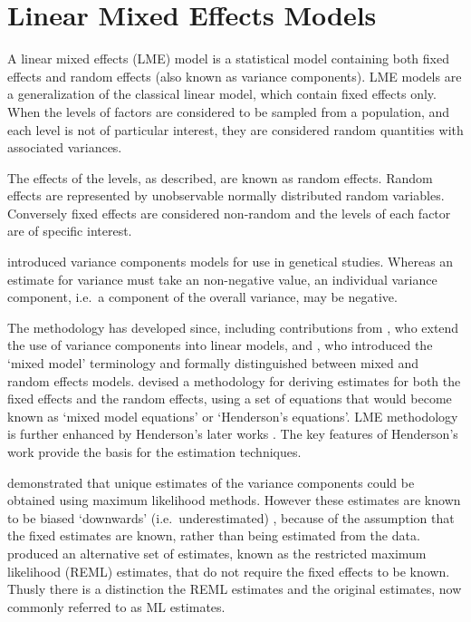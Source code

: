 \documentclass[12pt, a4paper]{report}
\theoremstyle{plain}
\theoremstyle{definition}
\theoremstyle{remark}
\begin{document}
\section{Linear Mixed Effects Models}
A linear mixed effects (LME) model is a statistical model containing both fixed effects and random effects (also known as variance components). LME models are a generalization of the classical linear model, which contain fixed effects only. When the levels of factors are considered to be sampled from a population, and each level is not of particular interest, they are considered random quantities with associated variances.

The effects of the levels, as described, are known as random effects. Random effects are represented by unobservable normally distributed random variables. Conversely fixed effects are considered non-random and the levels of each factor are of specific interest.

\citet{Fisher4} introduced variance components models for use in genetical studies. Whereas an estimate for variance must take an non-negative value, an individual variance component, i.e.\ a component of the overall variance, may be negative.

The methodology has developed since, including contributions from
\citet{tippett}, who extend the use of variance components into linear models, and \citet{eisenhart}, who introduced the `mixed model' terminology and formally distinguished between mixed and random effects models. \citet{Henderson:1950} devised a methodology for deriving estimates for both the fixed effects and the random effects, using a set of equations that would become known as `mixed model equations' or `Henderson's equations'.
LME methodology is further enhanced by Henderson's later works \citep{Henderson53, Henderson59,Henderson63,Henderson73,Henderson84a}. The key features of Henderson's work provide the basis for the estimation techniques.

\citet{HartleyRao} demonstrated that unique estimates of the variance components could be obtained using maximum likelihood methods. However these estimates are known to be biased `downwards' (i.e.\ underestimated) , because of the assumption that the fixed estimates are known, rather than being estimated from the data. \citet{PattersonThompson} produced an alternative set of estimates, known as the restricted maximum likelihood (REML) estimates, that do not require the fixed effects to be known. Thusly there is a distinction the REML estimates and the original estimates, now commonly referred to as ML estimates.
\end{document}

